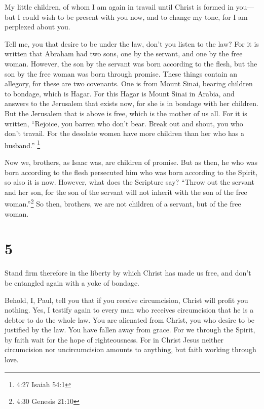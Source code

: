  My little children, of whom I am again in travail until
Christ is formed in you---  but I could wish to be present
with you now, and to change my tone, for I am perplexed about you.

 Tell me, you that desire to be under the law, don't you
listen to the law?  For it is written that Abraham had two
sons, one by the servant, and one by the free woman. 
However, the son by the servant was born according to the flesh, but the
son by the free woman was born through promise.  These
things contain an allegory, for these are two covenants. One is from
Mount Sinai, bearing children to bondage, which is Hagar. 
For this Hagar is Mount Sinai in Arabia, and answers to the Jerusalem
that exists now, for she is in bondage with her children. 
But the Jerusalem that is above is free, which is the mother of us all.
 For it is written, ``Rejoice, you barren who don't bear.
Break out and shout, you who don't travail. For the desolate women have
more children than her who has a husband.'' \footnote{4:27 Isaiah 54:1}

 Now we, brothers, as Isaac was, are children of promise.
 But as then, he who was born according to the flesh
persecuted him who was born according to the Spirit, so also it is now.
 However, what does the Scripture say? ``Throw out the
servant and her son, for the son of the servant will not inherit with
the son of the free woman.''\footnote{4:30 Genesis 21:10} 
So then, brothers, we are not children of a servant, but of the free
woman.

\hypertarget{section-4}{%
\section{5}\label{section-4}}

 Stand firm therefore in the liberty by which Christ has
made us free, and don't be entangled again with a yoke of bondage.

 Behold, I, Paul, tell you that if you receive circumcision,
Christ will profit you nothing.  Yes, I testify again to
every man who receives circumcision that he is a debtor to do the whole
law.  You are alienated from Christ, you who desire to be
justified by the law. You have fallen away from grace.  For
we through the Spirit, by faith wait for the hope of righteousness.
 For in Christ Jesus neither circumcision nor uncircumcision
amounts to anything, but faith working through love.

